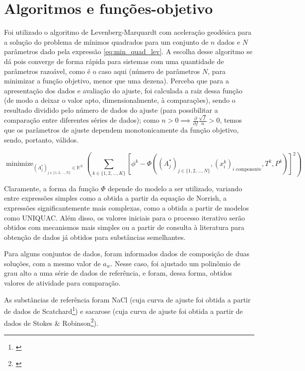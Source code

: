 \documentclass[
	12pt,				%
	openright,
	twoside,
	a4paper,			%
	brazil,			%
	french,				%
	spanish,			%
	english				%
	]{abntex2}
\DeclareMathOperator*{\minimize}{minimize}
\begin{document}
\chapter{Algoritmos e funções-objetivo}

Foi utilizado o algoritmo de Levenberg-Marquardt com aceleração geodésica para a
solução do problema de mínimos quadrados para um conjunto de $n$ dados e $N$
parâmetros dado pela expressão \ref{eq:min_quad_lev}.
A escolha desse algoritmo se dá pois converge de forma rápida para sistemas com
uma quantidade de parâmetros razoável, como é o caso aqui (número de parâmetros
$N$, para minimizar a função objetivo, menor que uma dezena).
Perceba que para a apresentação dos dados e avaliação do ajuste, foi calculada a
raiz dessa função (de modo a deixar o valor apto, dimensionalmente, à comparações),
sendo o resultado dividido pelo número de dados do ajuste (para possibilitar a
comparação entre diferentes séries de dados); como
$n>0 \implies \frac{\partial}{\partial f}\frac{\sqrt{f}}{n} >0$, temos que os
parâmetros de ajuste dependem monotonicamente da função objetivo, sendo, portanto,
válidos.

\begin{equation}
	\label{eq:min_quad_lev}
	\minimize_{(A_j^*)_{j \in \{1,2,\ldots,N\}} \in \mathbb{R}^N}%
	\left(\sum_{k \in \{1,2,\ldots,K\}}\left[\phi^k - \Phi((A^*_j)_{j%
	\in \{1, 2, \ldots, N\}}, (x^k_i)_\text{$i$ componente},%
	T^k, P^k)\right]^2\right)
\end{equation}

Claramente, a forma da função $\Phi$ depende do modelo a ser utilizado, variando
entre expressões simples como a obtida a partir da equação de Norrish, a
expressões significantemente mais complexas, como a obtida a partir de modelos
como UNIQUAC. Além disso, os valores iniciais para o processo iterativo serão
obtidos com mecanismos mais simples ou a partir de consulta à literatura para
obtenção de dados já obtidos para substâncias semelhantes.

Para alguns conjuntos de dados, foram informados dados de composição de duas
soluções, com a mesmo valor de $a_w$. Nesse caso, foi ajustado um polinômio
de grau alto a uma série de dados de referência, e foram, dessa forma, obtidos
valores de atividade para comparação.

As substâncias de referência foram NaCl (cuja curva de ajuste foi obtida a
partir de dados de Scatchard\footnote{\cite{scatchard1938}}) e sacarose (cuja
curva de ajuste foi obtida a partir de dados de Stokes \& Robinson\footnote{%
\cite{stokes1961}}).
\end{document}
